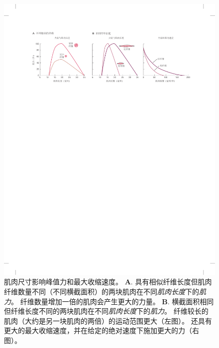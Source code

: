 \begin{figure}[htbp]
	\centering
	\includegraphics[width=1.0\linewidth]{chap31/fig_31_13}
	\caption{肌肉尺寸影响峰值力和最大收缩速度\cite{lieber2000functional}。
	\textbf{A}. 具有相似纤维长度但肌肉纤维数量不同（不同横截面积）的两块肌肉在不同\textit{肌肉长度}下的\textit{肌力}。
	纤维数量增加一倍的肌肉会产生更大的力量。
	\textbf{B}. 横截面积相同但纤维长度不同的两块肌肉在不同\textit{肌肉长度}下的\textit{肌力}。
	纤维较长的肌肉（大约是另一块肌肉的两倍）的运动范围更大（左图）。 
	还具有更大的最大收缩速度，并在给定的绝对速度下施加更大的力（右图）。}
	\label{fig:31_13}
\end{figure}


